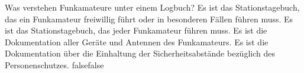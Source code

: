     {Was verstehen Funkamateure unter einem Logbuch?}
    {Es ist das Stationstagebuch, das ein Funkamateur freiwillig führt oder in besonderen Fällen führen muss.}
    {Es ist das Stationstagebuch, das jeder Funkamateur führen muss.}
    {Es ist die Dokumentation aller Geräte und Antennen des Funkamateurs.}
    {Es ist die Dokumentation über die Einhaltung der Sicherheitsabstände bezüglich des Personenschutzes.}
    {false}{false}
